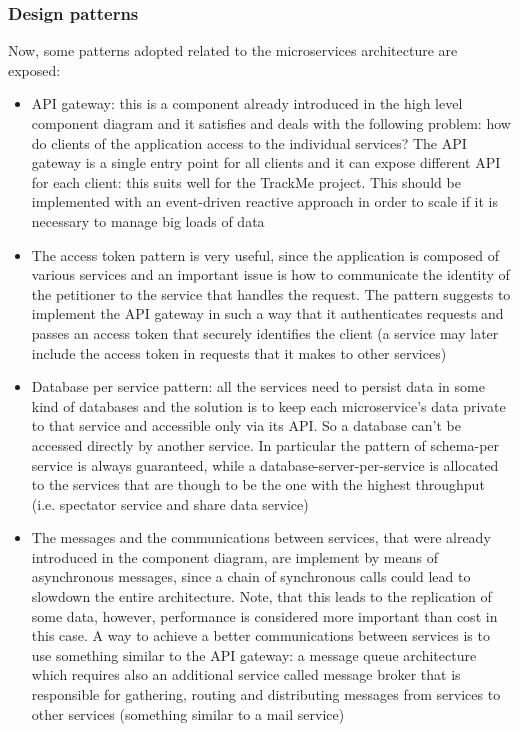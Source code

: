 \subsubsection{Design patterns}
Now, some patterns adopted related to the microservices architecture are exposed:
\begin{itemize}
\item API gateway: this is a component already introduced in the high level component diagram and it
satisfies and deals with the following problem: how do clients of the application access to the individual
services? The API gateway is a single entry point for all clients and it can expose different API for
each client: this suits well for the TrackMe project. This should be implemented with an event-driven
reactive approach in order to scale if it is necessary to manage big loads of data \\
\item The access token pattern is very useful, since the application is composed of various services and
an important issue is how to communicate the identity of the petitioner to the service that handles the
request. 
The pattern suggests to implement the API gateway in such
a way that it authenticates requests and passes an access token that securely identifies the client (a
service may later include the access token in requests that it makes to other services)
\item Database per service pattern: all the services need to persist data in some kind of databases and
the solution is to keep each microservice's data private to that service and accessible only via its API.
So a database can't be accessed directly by another service. In particular the pattern of schema-per
service is always guaranteed, while a database-server-per-service is allocated to the services that are
though to be the one with the highest throughput (i.e. spectator service and share data service)
\item The messages and the communications between services, that were already introduced in the component diagram, are implement by means of
asynchronous messages, since a chain of synchronous calls could lead to slowdown the entire architecture. Note, that this leads to the
replication of some data, however, performance is considered more important than cost in this case. A way to achieve a better communications between services is to use something similar to the API gateway: a message queue architecture which requires also an additional service called message broker that is responsible for gathering, routing and distributing messages from services to other services (something similar to a mail service)

\end{itemize}
